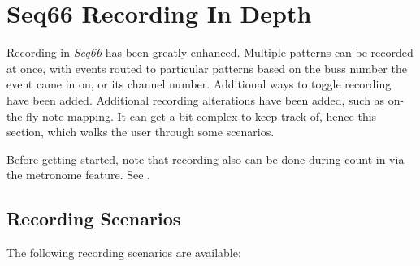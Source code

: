 %
%
%

\section{Seq66 Recording In Depth}
\label{sec:recording}

   Recording in \textsl{Seq66} has been greatly enhanced.
   Multiple patterns can be recorded at once, with events
   routed to particular patterns based on the buss number the event came
   in on, or its channel number.
   Additional ways to toggle recording have been added.
   Additional recording alterations have been added, such as on-the-fly note
   mapping.
   It can get a bit complex to keep track of, hence this section,
   which walks the user through some scenarios.

   Before getting started, note that recording also
   can be done during count-in via the metronome feature.
   See .

\subsection{Recording Scenarios}
\label{sec:recording_scenarios}

   The following recording scenarios are available:

